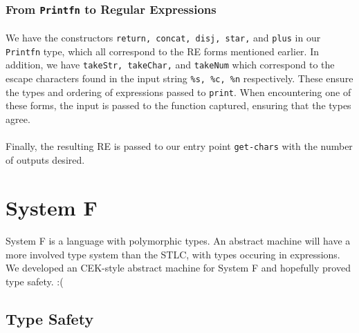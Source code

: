 \documentclass[12pt]{article}
\begin{document}
\subsubsection{From \texttt{Printfn} to Regular Expressions}
\paragraph{}
We have the constructors \texttt{return, concat, disj, star,} and \texttt{plus} in our \texttt{Printfn} type, which all correspond to the RE forms mentioned earlier. In addition, we have \texttt{takeStr, takeChar,} and \texttt{takeNum} which correspond to the escape characters found in the input string \texttt{\%s, \%c, \%n} respectively. These ensure the types and ordering of expressions passed to \texttt{print}. When encountering one of these forms, the input is passed to the function captured, ensuring that the types agree.
\paragraph{} Finally, the resulting RE is passed to our entry point \texttt{get-chars} with the number of outputs desired.


\section{System F}
\paragraph{} System F is a language with polymorphic types. An abstract machine will have a more involved type system than the STLC, with types occuring in expressions. We developed an CEK-style abstract machine for System F and hopefully proved type safety. :(

\subsection{Type Safety}
\end{document}
